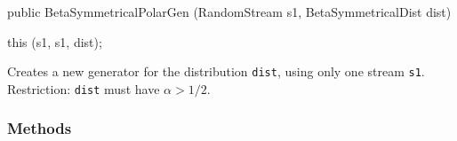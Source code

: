 \begin{code}

   public BetaSymmetricalPolarGen (RandomStream s1,
                                   BetaSymmetricalDist dist) \begin{hide} {
      this (s1, s1, dist);
   }\end{hide}
\end{code}
  \begin{tabb}  Creates a new generator for the distribution \texttt{dist},
     using only one stream \texttt{s1}.
    Restriction: \texttt{dist} must have $\alpha > 1/2$.
  \end{tabb}


\subsubsection* {Methods}

